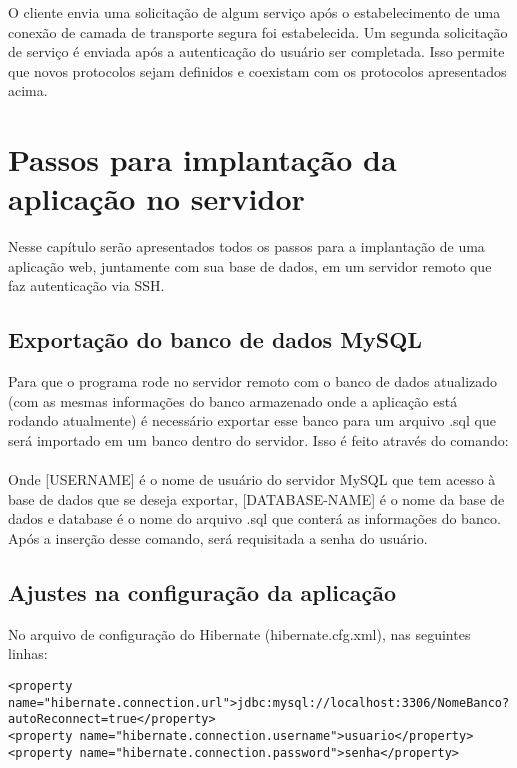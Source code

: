 \documentclass[11pt,a4paper]{report}
\begin{document}
O cliente envia uma solicitação de algum serviço após o estabelecimento de uma conexão de camada de transporte segura foi estabelecida. Um segunda solicitação de serviço é enviada após a autenticação do usuário ser completada. Isso permite que novos protocolos sejam definidos e coexistam com os protocolos apresentados acima. \cite{ylonen2006secure}
 

\newpage

\chapter{Passos para implantação da aplicação no servidor}

Nesse capítulo serão apresentados todos os passos para a implantação de uma aplicação web, juntamente com sua base de dados, em um servidor remoto que faz autenticação via SSH. 

\section{Exportação do banco de dados MySQL}

Para que o programa rode no servidor remoto com o banco de dados atualizado (com as mesmas informações do banco armazenado onde a aplicação está rodando atualmente) é necessário exportar esse banco para um arquivo .sql que será importado em um banco dentro do servidor. Isso é feito através do comando:\\

 \\

Onde [USERNAME] é o nome de usuário do servidor MySQL que tem acesso à base de dados que se deseja exportar, [DATABASE-NAME] é o nome da base de dados e database é o nome do arquivo .sql que conterá as informações do banco. Após a inserção desse comando, será requisitada a senha do usuário. 


\section{Ajustes na configuração da aplicação \label{configuracao}}

No arquivo de configuração do Hibernate (hibernate.cfg.xml), nas seguintes linhas:

\lstset{language=Java}
\begin{lstlisting}
<property name="hibernate.connection.url">jdbc:mysql://localhost:3306/NomeBanco?autoReconnect=true</property>
<property name="hibernate.connection.username">usuario</property>
<property name="hibernate.connection.password">senha</property>
\end{lstlisting}
\end{document}
